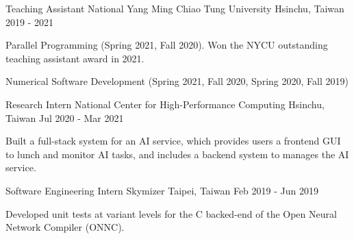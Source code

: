 

\begin{cventries}

  \cventry
    {Teaching Assistant} %
    {National Yang Ming Chiao Tung University} %
    {Hsinchu, Taiwan} %
    {2019 - 2021} %
    {
      \begin{cvitems} %
        \item {Parallel Programming (Spring 2021, Fall 2020). Won the NYCU outstanding teaching assistant award in 2021.}
        \item {Numerical Software Development (Spring 2021, Fall 2020, Spring 2020, Fall 2019)}
      \end{cvitems}
    }

  \cventry
    {Research Intern} %
    {National Center for High-Performance Computing} %
    {Hsinchu, Taiwan} %
    {Jul 2020 - Mar 2021} %
    {
      \begin{cvitems} %
        \item {Built a full-stack system for an AI service,
              which provides users a frontend GUI to lunch and monitor AI tasks,
              and includes a backend system to manages the AI service.}
      \end{cvitems}
    }

  \cventry
    {Software Engineering Intern} %
    {Skymizer} %
    {Taipei, Taiwan} %
    {Feb 2019 - Jun 2019} %
    {
      \begin{cvitems} %
        \item {Developed unit tests at variant levels for the C backed-end of the Open Neural Network Compiler (ONNC).}
      \end{cvitems}
    }


\end{cventries}
